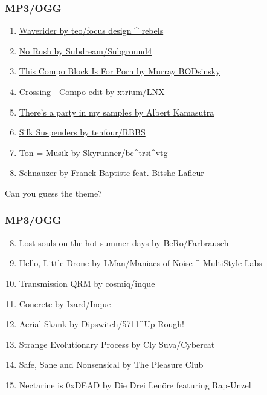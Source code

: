\documentclass{beamer}
\begin{document}
\begin{frame}
  \frametitle{MP3/OGG}
  \begin{enumerate}
  \item \href{https://demozoo.org/music/191906/}{Waverider by teo/focus design \^{} rebels}
  \item \href{https://demozoo.org/music/191909/}{No Rush by Subdream/Subground4}
  \item \href{https://demozoo.org/music/191907/}{This Compo Block Is For Porn by Murray BODsinsky}
  \item \href{https://demozoo.org/music/191910/}{Crossing - Compo edit by xtrium/LNX}
  \item \href{https://demozoo.org/music/191917/}{There's a party in my samples by Albert Kamasutra}
  \item \href{https://demozoo.org/music/191911/}{Silk Suspenders by tenfour/RBBS}
  \item \href{https://demozoo.org/music/191908/}{Ton = Musik by Skyrunner/bc\^{}trsi\^{}vtg}
  \item \href{https://demozoo.org/music/191915/}{Schnauzer by Franck Baptiste feat. Bitshe Lafleur}
  \end{enumerate}
  Can you guess the theme?
\end{frame}
\begin{frame}
  \frametitle{MP3/OGG}
  \begin{enumerate}
    \setcounter{enumi}{7}
  \item Lost souls on the hot summer days by BeRo/Farbrausch
  \item Hello, Little Drone by LMan/Maniacs of Noise \^{} MultiStyle Labs
  \item Transmission QRM by cosmiq/inque
  \item Concrete by Izard/Inque
  \item Aerial Skank by Dipswitch/5711\^{}Up Rough!
  \item Strange Evolutionary Process by Cly Suva/Cybercat
  \item Safe, Sane and Nonsensical by The Pleasure Club
  \item Nectarine is 0xDEAD by Die Drei Lenöre featuring Rap-Unzel
  \end{enumerate}
\end{frame}
\end{document}
